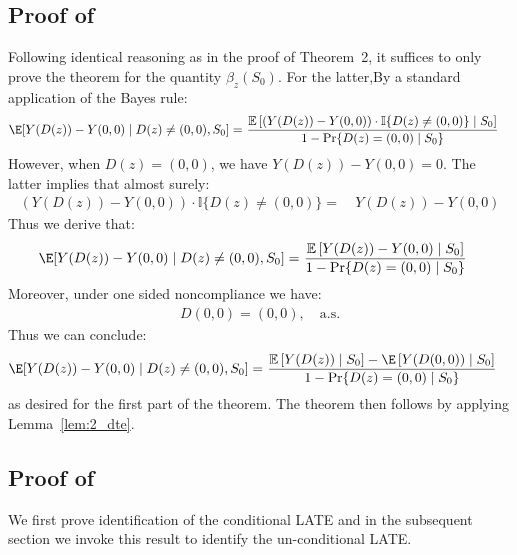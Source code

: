 \subsection{Proof of }

Following identical reasoning as in the proof of Theorem~2, it suffices to only prove the theorem for the quantity $\beta_z(S_0)$. For the latter,By a standard application of the Bayes rule:
\begin{align*}
\E[Y(D(z)) - Y(0,0) \mid D(z) \neq (0,0), S_0]
=~&\frac{
    \mathbb{E}\left[
      \left( Y(D(z)) - Y(0,0) \right) 
      \cdot \mathbb{I} \{ D(z)\neq (0,0) \}\mid S_0
    \right]
  }{ 1 - \Pr\{ D(z)=(0,0) \mid S_0\} }
\end{align*}
However, when $D(z)=(0,0)$, we have $Y(D(z)) - Y(0,0)=0$. 
The latter implies that almost surely:
\begin{align*}
    \left( Y(D(z)) - Y(0,0) \right) 
      \cdot \mathbb{I} \{ D(z)\neq (0,0) \} 
      =~& Y(D(z)) - Y(0,0) 
\end{align*}
Thus we derive that:
\begin{align*}
 \E[Y(D(z)) - Y(0,0) \mid D(z) \neq (0,0), S_0]=~& \frac{
    \mathbb{E}\left[ Y(D(z)) - Y(0,0) \mid S_0\right]
  }{ 1 - \Pr\{ D(z)=(0,0) \mid S_0\} }
\end{align*}
Moreover, under one sided noncompliance we have:
\begin{align*}
    D(0,0) = (0,0), \quad \text{a.s.}
\end{align*}
Thus we can conclude:
\begin{align*}
 \E[Y(D(z)) - Y(0,0) \mid D(z) \neq (0,0), S_0]=~& \frac{
    \mathbb{E}\left[ Y(D(z))\mid S_0\right] - \E\left[Y(D(0,0)) \mid S_0\right]
  }{ 1 - \Pr\{ D(z)=(0,0) \mid S_0\} }
\end{align*}
as desired for the first part of the theorem. The theorem then follows by applying Lemma~\ref{lem:2_dte}.

\subsection{Proof of }

We first prove identification of the conditional LATE and in the subsequent section we invoke this result to identify the un-conditional LATE.

